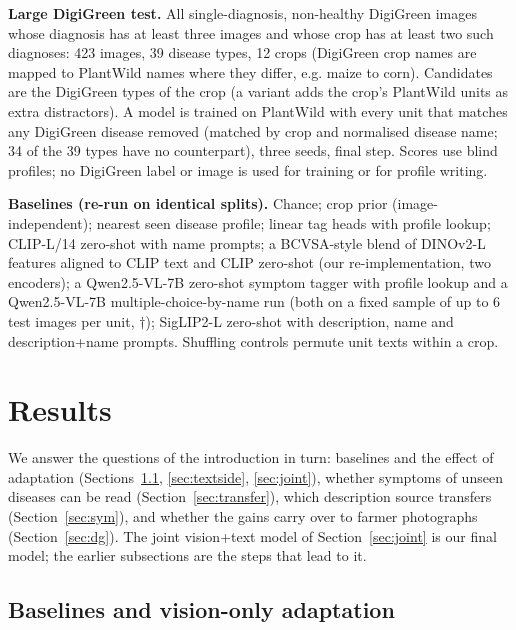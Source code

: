 \documentclass[11pt]{article}
\begin{document}
\textbf{Large DigiGreen test.} All single-diagnosis, non-healthy DigiGreen images whose diagnosis has at least three images and whose crop has at least two such diagnoses: 423 images, 39 disease types, 12 crops (DigiGreen crop names are mapped to PlantWild names where they differ, e.g. maize to corn). Candidates are the DigiGreen types of the crop (a variant adds the crop's PlantWild units as extra distractors). A model is trained on PlantWild with every unit that matches any DigiGreen disease removed (matched by crop and normalised disease name; 34 of the 39 types have no counterpart), three seeds, final step. Scores use blind profiles; no DigiGreen label or image is used for training or for profile writing.

\textbf{Baselines (re-run on identical splits).} Chance; crop prior (image-independent); nearest seen disease profile; linear tag heads with profile lookup; CLIP-L/14 zero-shot with name prompts; a BCVSA-style blend of DINOv2-L \cite{dinov2} features aligned to CLIP text and CLIP zero-shot (our re-implementation, two encoders); a Qwen2.5-VL-7B \cite{qwen} zero-shot symptom tagger with profile lookup and a Qwen2.5-VL-7B multiple-choice-by-name run (both on a fixed sample of up to 6 test images per unit, $\dagger$); SigLIP2-L zero-shot with description, name and description+name prompts. Shuffling controls permute unit texts within a crop.

\section{Results}\label{sec:allresults}
We answer the questions of the introduction in turn: baselines and the effect of adaptation (Sections~\ref{sec:results}, \ref{sec:textside}, \ref{sec:joint}), whether symptoms of unseen diseases can be read (Section~\ref{sec:transfer}), which description source transfers (Section~\ref{sec:sym}), and whether the gains carry over to farmer photographs (Section~\ref{sec:dg}). The joint vision+text model of Section~\ref{sec:joint} is our final model; the earlier subsections are the steps that lead to it.

\subsection{Baselines and vision-only adaptation}\label{sec:results}
\begin{table}[t]\centering\small
\resizebox{\linewidth}{!}{}
\caption{Unit-macro top-1 on the 10-fold unit-grouped CV (116 test units, crop given). Trained models: mean of three seeds. $^\dagger$ evaluated on a sample of up to 6 test images per unit. The tag-head row is the single-run number from our experiment log. ``Ours'' is the vision-only LoRA model; the final joint vision+text model (0.684 with image-derived descriptions, compared with 0.625 for its own zero-shot start) is in Table~\ref{tab:joint}.}
\label{tab:main}
\end{table}
\end{document}
